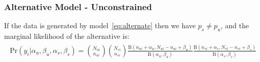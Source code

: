 \documentclass[11pt]{article}
\begin{document}
 \subsubsection{Alternative Model - Unconstrained}
 If the data is generated by model~\eqref{eq:alternate} then we have  $p_s\ne p_u$, and the marginal likelihood of the alternative is:
\begin{align}
	\begin{split}
\mathrm{Pr}(y_i|\alpha_u,\beta_u,\alpha_s,\beta_s) =\binom{N_{ui}}{n_{ui}} \binom{N_{si}}{n_{si}}\frac{\mathrm{B}(n_{ui}+\alpha_u,N_{ui}-n_{ui}+\beta_u)}{\mathrm{B}(\alpha_u,\beta_u)}\frac{\mathrm{B}(n_{si}+\alpha_s,N_{si}-n_{si}+\beta_s)}{\mathrm{B}(\alpha_s,\beta_s)}\label{model2:unconstrained}
\end{split}
\end{align}
\end{document}

